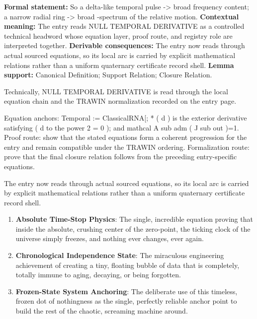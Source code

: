 \begingroup\footnotesize\setlength{\emergencystretch}{3em}\sloppy
\textbf{Formal statement:} So a delta-like temporal pulse -> broad frequency content; a narrow radial ring -> broad -spectrum of the relative motion. \textbf{Contextual meaning:} The entry reads NULL TEMPORAL DERIVATIVE as a controlled technical headword whose equation layer, proof route, and registry role are interpreted together. \textbf{Derivable consequences:} The entry now reads through actual sourced equations, so its local arc is carried by explicit mathematical relations rather than a uniform quaternary certificate record shell. \textbf{Lemma support:} Canonical Definition; Support Relation; Closure Relation.\par
\endgroup

Technically, NULL TEMPORAL DERIVATIVE is read through the local equation chain and the TRAWIN normalization recorded on the entry page.

Equation anchors: Temporal := ClassicalRNA[; * ( d ) is the exterior derivative satisfying ( d to the power 2 = 0 ); and mathcal A sub adm ( J sub out )=1. Proof route: show that the stated equations form a coherent progression for the entry and remain compatible under the TRAWIN ordering. Formalization route: prove that the final closure relation follows from the preceding entry-specific equations.

The entry now reads through actual sourced equations, so its local arc is carried by explicit mathematical relations rather than a uniform quaternary certificate record shell.
\endgroup

\begin{enumerate}[leftmargin=1.6em,itemsep=6pt,topsep=4pt]
\item \textbf{Absolute Time-Stop Physics}: The single, incredible equation proving that inside the absolute, crushing center of the zero-point, the ticking clock of the universe simply freezes, and nothing ever changes, ever again.
\item \textbf{Chronological Independence State}: The miraculous engineering achievement of creating a tiny, floating bubble of data that is completely, totally immune to aging, decaying, or being forgotten.
\item \textbf{Frozen-State System Anchoring}: The deliberate use of this timeless, frozen dot of nothingness as the single, perfectly reliable anchor point to build the rest of the chaotic, screaming machine around.
\end{enumerate}

